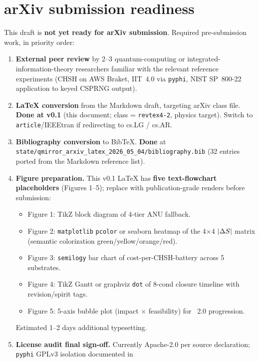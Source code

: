 \section{arXiv submission readiness}\label{app:arxiv}

This draft is \textbf{not yet ready for arXiv submission}. Required
pre-submission work, in priority order:

\begin{enumerate}
\item \textbf{External peer review} by 2--3 quantum-computing or
  integrated-information-theory researchers familiar with the
  relevant reference experiments (CHSH on AWS Braket, IIT~4.0
  \phistar{} via \texttt{pyphi}, NIST SP~800-22 application to keyed
  CSPRNG output).
\item \textbf{LaTeX conversion} from the Markdown draft, targeting
  arXiv class file. \textbf{Done at v0.1} (this document; class =
  \texttt{revtex4-2}, physics target). Switch to
  \texttt{article}/IEEEtran if redirecting to cs.LG / cs.AR.
\item \textbf{Bibliography conversion} to BibTeX. \textbf{Done} at
  \texttt{state/qmirror\_arxiv\_latex\_2026\_05\_04/bibliography.bib}
  (32 entries ported from the Markdown reference list).
\item \textbf{Figure preparation.} This v0.1 LaTeX has \textbf{five
  text-flowchart placeholders} (Figures 1--5); replace with
  publication-grade renders before submission:
  \begin{itemize}
  \item[(a)] Figure 1: TikZ block diagram of 4-tier ANU fallback.
  \item[(b)] Figure 2: \texttt{matplotlib} \texttt{pcolor} or seaborn
    heatmap of the 4$\times$4 $\lvert\Delta S\rvert$ matrix (semantic colorization
    green/yellow/orange/red).
  \item[(c)] Figure 3: \texttt{semilogy} bar chart of
    cost-per-CHSH-battery across 5 substrates.
  \item[(d)] Figure 4: TikZ Gantt or graphviz \texttt{dot} of 8-cond
    closure timeline with revision/spirit tags.
  \item[(e)] Figure 5: 5-axis bubble plot (impact $\times$
    feasibility) for \qmirror{}~2.0 progression.
  \end{itemize}
  Estimated 1--2 days additional typesetting.
\item \textbf{License audit final sign-off.} Currently Apache-2.0 per
  source declaration; \texttt{pyphi} GPLv3 isolation documented in

\end{enumerate}
